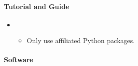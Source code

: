 \documentclass[letterpaper,10pt,english]{sphinxmanual}
\begin{document}
\paragraph{Tutorial and Guide}
\label{\detokenize{resource/astro/topics/ccd_reduction:tutorial-and-guide}}\begin{itemize}
\item {} 
\begin{itemize}
\item {} 
Only use  affiliated Python packages.

\end{itemize}

\end{itemize}


\paragraph{Software}
\label{\detokenize{resource/astro/topics/ccd_reduction:software}}
\end{document}
